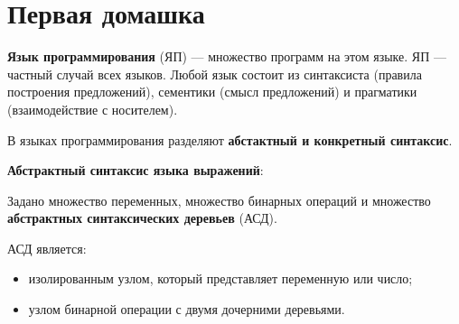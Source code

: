 


\usepackage{fancyvrb}
\usepackage{fvextra}

\usepackage[scr=rsfs]{mathalpha}

\newcommand{\Lang}{\mathscr{L}}
\newcommand{\Lother}{\mathscr{M}} %
\newcommand{\Lexpr}{\mathscr{E}}  %
\newcommand{\Lstat}{\mathscr{S}}  %
\newcommand{\Linst}{\mathscr{I}}  %
\newcommand{\Lprog}{\mathscr{P}}  %

\newcommand{\Conf}{\mathscr{C}} %
\newcommand{\Word}{\mathscr{W}} %
\newcommand{\Var}{\mathscr{X}}  %

\newcommand{\neatarrow}{\DOTSB\Rightarrow}

\newcommand{\semant}[1]{\llbracket #1 \rrbracket} 



\section{Первая домашка}

\textbf{Язык программирования} (ЯП) --- множество программ на этом языке. ЯП
--- частный случай всех языков. Любой язык состоит из синтаксиста (правила
построения предложений), сементики (смысл предложений) и прагматики
(взаимодействие с носителем).

В языках программирования разделяют \textbf{абстактный и конкретный синтаксис}.

\textbf{Абстрактный синтаксис языка выражений}:


Задано множество переменных, множество бинарных операций и множество
\textbf{абстрактных синтаксических деревьев} (АСД).

АСД является:

\begin{itemize}
    \item изолированным узлом, который представляет переменную или число;

    \item узлом бинарной операции с двумя дочерними деревьями.
\end{itemize}

